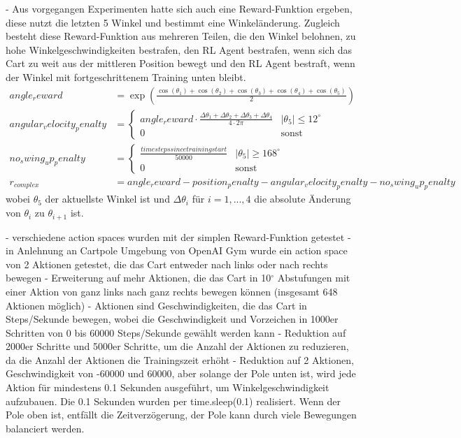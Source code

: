 - Aus vorgegangen Experimenten hatte sich auch eine Reward-Funktion ergeben, diese nutzt die letzten 5 Winkel und bestimmt eine Winkeländerung. Zugleich besteht diese Reward-Funktion aus mehreren Teilen, die den Winkel belohnen, zu hohe Winkelgeschwindigkeiten bestrafen, den RL Agent bestrafen, wenn sich das Cart zu weit aus der mittleren Position bewegt und den RL Agent bestraft, wenn der Winkel mit fortgeschrittenem Training unten bleibt. \begin{align}
    angle_reward &= \exp\left(\frac{\cos(\theta_1) + \cos(\theta_2) + \cos(\theta_3) + \cos(\theta_4) + \cos(\theta_5)}{2}\right) \\
    angular_velocity_penalty &= \begin{cases}
        angle_reward\cdot\frac{\Delta\theta_1 + \Delta\theta_2 + \Delta\theta_3 + \Delta\theta_4}{4\cdot 2\pi} & \vert\theta_5\vert \le 12^\circ \\
        0 & \text{sonst}
    \end{cases} \\
    no_swing_up_penalty &= \begin{cases}
        \frac{time steps since training start}{50000} & \vert\theta_5\vert \ge 168^\circ \\
        0 & \text{sonst}
    \end{cases} \\
    r_{complex} &= angle_reward - position_penalty - angular_velocity_penalty - no_swing_up_penalty
\end{align}
wobei $\theta_5$ der aktuellste Winkel ist und $\Delta\theta_i$ für $i=1,...,4$ die absolute Änderung von $\theta_i$ zu $\theta_{i+1}$ ist. 

- verschiedene action spaces wurden mit der simplen Reward-Funktion getestet
- in Anlehnung an Cartpole Umgebung von OpenAI Gym wurde ein action space von 2 Aktionen getestet, die das Cart entweder nach links oder nach rechts bewegen
- Erweiterung auf mehr Aktionen, die das Cart in 10$^\circ$ Abstufungen mit einer Aktion von ganz links nach ganz rechts bewegen können (insgesamt 648 Aktionen möglich)
- Aktionen sind Geschwindigkeiten, die das Cart in Steps/Sekunde bewegen, wobei die Geschwindigkeit und Vorzeichen in 1000er Schritten von 0 bis 60000 Steps/Sekunde gewählt werden kann
- Reduktion auf 2000er Schritte und 5000er Schritte, um die Anzahl der Aktionen zu reduzieren, da die Anzahl der Aktionen die Trainingszeit erhöht
- Reduktion auf 2 Aktionen, Geschwindigkeit von -60000 und 60000, aber solange der Pole unten ist, wird jede Aktion für mindestens 0.1 Sekunden ausgeführt, um Winkelgeschwindigkeit aufzubauen. Die 0.1 Sekunden wurden per time.sleep(0.1) realisiert. Wenn der Pole oben ist, entfällt die Zeitverzögerung, der Pole kann durch viele Bewegungen balanciert werden.